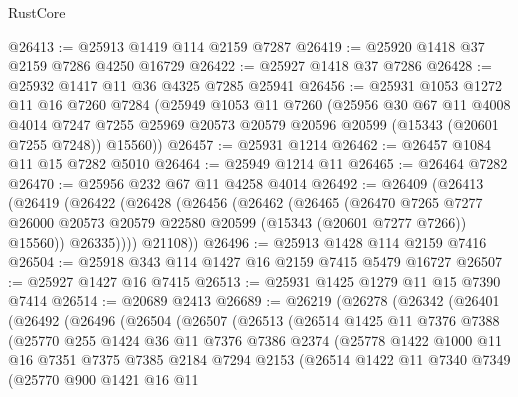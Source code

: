 \begin{lexlean}{RustCore}
\begin{coremodule}
@26413 := @25913 @1419 @114 @2159 @7287
@26419 := @25920 @1418 @37 @2159 @7286 @4250 @16729
@26422 := @25927 @1418 @37 @7286
@26428 := @25932 @1417 @11 @36 @4325 @7285 @25941
@26456 := @25931
    @1053
    @1272
    @11
    @16
    @7260
    @7284
    (@25949
      @1053
      @11
      @7260
      (@25956
        @30
        @67
        @11
        @4008
        @4014
        @7247
        @7255
        @25969
        @20573
        @20579
        @20596
        @20599
        (@15343 (@20601 @7255 @7248))
        @15560))
@26457 := @25931 @1214
@26462 := @26457 @1084 @11 @15 @7282 @5010
@26464 := @25949 @1214 @11
@26465 := @26464 @7282
@26470 := @25956 @232 @67 @11 @4258 @4014
@26492 := @26409
    (@26413
      (@26419
        (@26422
          (@26428
            (@26456
              (@26462
                (@26465
                  (@26470
                    @7265
                    @7277
                    @26000
                    @20573
                    @20579
                    @22580
                    @20599
                    (@15343 (@20601 @7277 @7266))
                    @15560))
                @26335))))
        @21108))
@26496 := @25913 @1428 @114 @2159 @7416
@26504 := @25918 @343 @114 @1427 @16 @2159 @7415 @5479 @16727
@26507 := @25927 @1427 @16 @7415
@26513 := @25931 @1425 @1279 @11 @15 @7390 @7414
@26514 := @20689 @2413
@26689 := @26219
    (@26278
      (@26342
        (@26401
          (@26492
            (@26496
              (@26504
                (@26507
                  (@26513
                    (@26514
                      @1425
                      @11
                      @7376
                      @7388
                      (@25770
                        @255
                        @1424
                        @36
                        @11
                        @7376
                        @7386
                        @2374
                        (@25778
                          @1422
                          @1000
                          @11
                          @16
                          @7351
                          @7375
                          @7385
                          @2184
                          @7294
                          @2153
                          (@26514
                            @1422
                            @11
                            @7340
                            @7349
                            (@25770
                              @900
                              @1421
                              @16
                              @11

\end{coremodule}
\end{lexlean}
